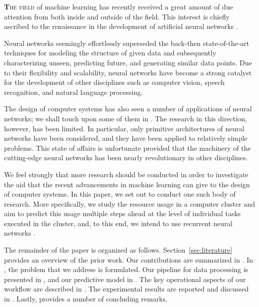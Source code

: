 \lettrine[findent=0.2em, nindent=0em]{\textbf{T}}{he field} of machine learning
has recently received a great amount of due attention from both inside and
outside of the field. This interest is chiefly ascribed to the renaissance in
the development of artificial neural networks \cite{goodfellow2016}.

Neural networks seemingly effortlessly superseded the back-then state-of-the-art
techniques for modeling the structure of given data and subsequently
characterizing unseen, predicting future, and generating similar data points.
Due to their flexibility and scalability, neural networks have become a strong
catalyst for the development of other disciplines such as computer vision,
speech recognition, and natural language processing.

The design of computer systems has also seen a number of applications of neural
networks; we shall touch upon some of them in . The research in
this direction, however, has been limited. In particular, only primitive
architectures of neural networks have been considered, and they have been
applied to relatively simple problems. This state of affairs is unfortunate
provided that the machinery of the cutting-edge neural networks has been nearly
revolutionary in other disciplines.

We feel strongly that more research should be conducted in order to investigate
the aid that the recent advancements in machine learning can give to the design
of computer systems. In this paper, we set out to conduct one such body of
research. More specifically, we study the resource usage in a computer cluster
and aim to predict this usage multiple steps ahead at the level of individual
tasks executed in the cluster, and, to this end, we intend to use recurrent
neural networks \cite{goodfellow2016}.

The remainder of the paper is organized as follows. Section~\ref{sec:literature}
provides an overview of the prior work. Our contributions are summarized in
. In , the problem that we address is
formulated. Our pipeline for data processing is presented in , and
our predictive model in . The key operational aspects of our
workflow are described in . The experimental results are
reported and discussed in . Lastly,  provides a
number of concluding remarks.

